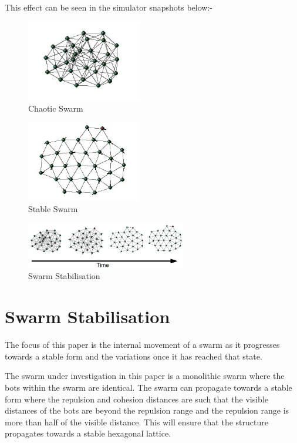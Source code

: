 \documentclass[10pt,journal,letterpaper,twoside]{IEEEtran}
\newcommand{\stability}{internal movement}
\begin{document}
This effect can be seen in the simulator snapshots below:-

\begin{figure}[H]
\begin{center}
\includegraphics[width=5cm]{figures/Chaos}
\end{center}
\caption{Chaotic Swarm\label{methods:Chaos1}}
\end{figure}
\begin{figure}[H]
\begin{center}
\includegraphics[width=5cm]{figures/Stable}
\end{center}
\caption{Stable Swarm\label{methods:Stable1}}
\end{figure}
\begin{figure}[H]
\begin{center}
\includegraphics[width=7cm]{figures/StableTime}
\end{center}
\caption{Swarm Stabilisation\label{methods:StableTime1}}
\end{figure}

\section{Swarm Stabilisation\label{section:swarmStabilisation}}
The focus of this paper is the \stability{} of a swarm as it progresses towards a stable form and the variations once it has reached that state.

The swarm under investigation in this paper is a monolithic swarm where the bots within the swarm are identical. The swarm can propagate towards a stable form where the repulsion and cohesion distances are such that the visible distances of the bots are beyond the repulsion range and the repulsion range is more than half of the visible distance. This will ensure that the structure propagates towards a stable hexagonal lattice.
\end{document}
